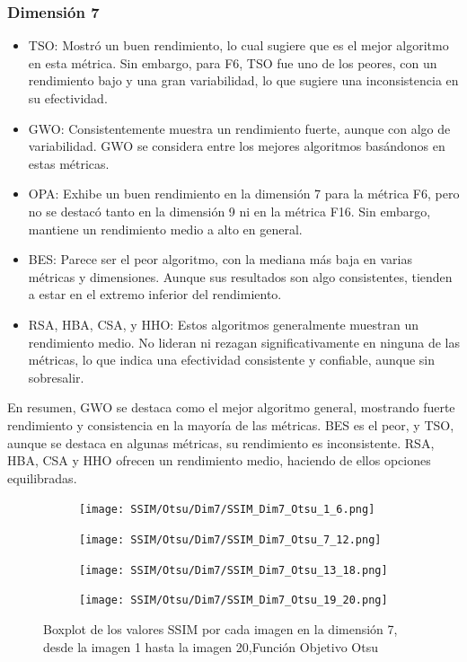 \documentclass[conference]{IEEEtran}
\begin{document}
\subsubsection{Dimensión 7}
\begin{itemize}
\item TSO: Mostró un buen rendimiento, lo cual sugiere que es el mejor algoritmo en esta métrica. Sin embargo, para F6, TSO fue uno de los peores, con un rendimiento bajo y una gran variabilidad, lo que sugiere una inconsistencia en su efectividad.
	
\item GWO: Consistentemente muestra un rendimiento fuerte, aunque con algo de variabilidad. GWO se considera entre los mejores algoritmos basándonos en estas métricas.
	
\item OPA: Exhibe un buen rendimiento en la dimensión 7 para la métrica F6, pero no se destacó tanto en la dimensión 9 ni en la métrica F16. Sin embargo, mantiene un rendimiento medio a alto en general.
	
\item BES: Parece ser el peor algoritmo, con la mediana más baja en varias métricas y dimensiones. Aunque sus resultados son algo consistentes, tienden a estar en el extremo inferior del rendimiento.
	
\item RSA, HBA, CSA, y HHO: Estos algoritmos generalmente muestran un rendimiento medio. No lideran ni rezagan significativamente en ninguna de las métricas, lo que indica una efectividad consistente y confiable, aunque sin sobresalir.

\end{itemize}
\noindent 	En resumen, GWO se destaca como el mejor algoritmo general, mostrando fuerte rendimiento y consistencia en la mayoría de las métricas. BES es el peor, y TSO, aunque se destaca en algunas métricas, su rendimiento es inconsistente. RSA, HBA, CSA y HHO ofrecen un rendimiento medio, haciendo de ellos opciones equilibradas.
\begin{figure}
	\centering
	\begin{subfigure}{0.4\textwidth}
		\texttt{[image: SSIM/Otsu/Dim7/SSIM\_Dim7\_Otsu\_1\_6.png]}
	\end{subfigure}
	
	\begin{subfigure}{0.4\textwidth}
		\texttt{[image: SSIM/Otsu/Dim7/SSIM\_Dim7\_Otsu\_7\_12.png]}
	\end{subfigure}
	\begin{subfigure}{0.4\textwidth}
		\texttt{[image: SSIM/Otsu/Dim7/SSIM\_Dim7\_Otsu\_13\_18.png]}
	\end{subfigure}
	\begin{subfigure}{0.4\textwidth}
		\texttt{[image: SSIM/Otsu/Dim7/SSIM\_Dim7\_Otsu\_19\_20.png]}
		\vspace{-120pt} %
	\end{subfigure}
	\caption{Boxplot de los valores SSIM por cada imagen en la dimensión 7, desde la imagen 1 hasta la imagen 20,Función Objetivo Otsu}
	\label{fig:imagenes}    
\end{figure}
\end{document}

